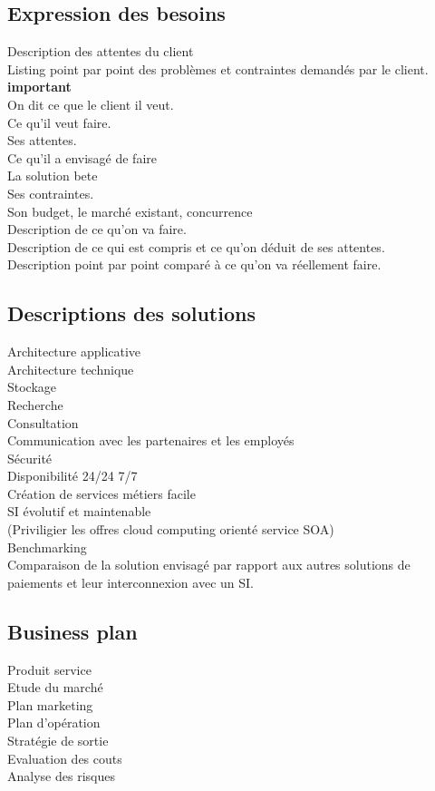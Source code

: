\documentclass[11pt, a4paper]{article}
\begin{document}
\subsection{Expression des besoins}
Description des attentes du client
\\ Listing point par point des problèmes et contraintes demandés par le client.
\textbf{important}
\\ On dit ce que le client il veut.
\\ Ce qu'il veut faire.
\\ Ses attentes.
  \\ Ce qu'il a envisagé de faire
  \\ La solution bete
\\ Ses contraintes.
  \\ Son budget, le marché existant, concurrence
\\ Description de ce qu'on va faire.
  \\ Description de ce qui est compris et ce qu'on déduit de ses attentes.
  \\ Description point par point comparé à ce qu'on va réellement faire.

\subsection{Descriptions des solutions}
Architecture applicative
\\ Architecture technique
  \\ Stockage
  \\ Recherche
  \\ Consultation
  \\ Communication avec les partenaires et les employés
  \\ Sécurité
  \\ Disponibilité 24/24 7/7
  \\ Création de services métiers facile
  \\ SI évolutif et maintenable
  \\ (Priviligier les offres cloud computing orienté service SOA)
\\ Benchmarking
  \\ Comparaison de la solution envisagé par rapport aux autres solutions de
  \\ paiements et leur interconnexion avec un SI.

\subsection{Business plan}
Produit service
\\ Etude du marché
\\ Plan marketing
\\ Plan d'opération
\\ Stratégie de sortie
\\ Evaluation des couts
\\ Analyse des risques
\end{document}
